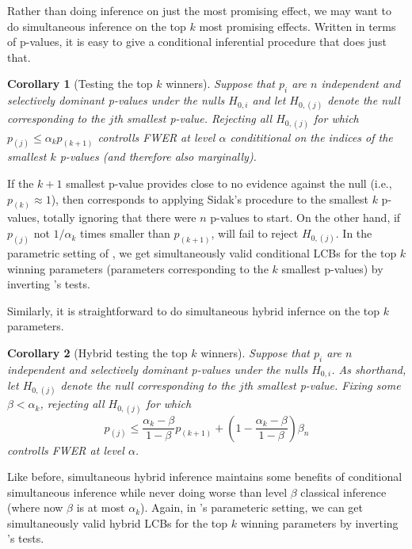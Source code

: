 \documentclass{article}
\newtheorem{corollary}{Corollary}
\begin{document}
Rather than doing inference on just the most promising effect, we may want to do simultaneous inference on the top $k$ most promising effects. Written in terms of p-values, it is easy to give a conditional inferential procedure that does just that. 
\begin{corollary}[Testing the top $k$ winners]
    \label{cor:cond_top_k}
    Suppose that $p_i$ are $n$ independent and selectively dominant p-values under the nulls $H_{0, i}$ and let $H_{0, (j)}$ denote the null corresponding to the $j$th smallest p-value. Rejecting all $H_{0, (j)}$ for which $p_{(j)} \leq \alpha_k p_{(k+1)}$ controlls FWER at level $\alpha$ condititional on the indices of the smallest $k$ p-values (and therefore also marginally). 
\end{corollary}
If the $k+1$ smallest p-value provides close to no evidence against the null (i.e., $p_{(k)} \approx 1$), then  corresponds to applying Sidak's procedure to the smallest $k$ p-values, totally ignoring that there were $n$ p-values to start. On the other hand, if $p_{(j)}$ not $1/\alpha_k$ times smaller than $p_{(k+ 1)}$,  will fail to reject $H_{0, (j)}$. In the parametric setting of , we get simultaneously valid conditional LCBs for the top $k$ winning parameters (parameters corresponding to the $k$ smallest p-values) by inverting 's tests. 


Similarly, it is straightforward to do simultaneous hybrid infernce on the top $k$ parameters. 
\begin{corollary}[Hybrid testing the top $k$ winners]
    \label{cor:hyb_top_k}
    Suppose that $p_i$ are $n$ independent and selectively dominant p-values under the nulls $H_{0, i}$. As shorthand, let $H_{0, (j)}$ denote the null corresponding to the $j$th smallest p-value. Fixing some $\beta < \alpha_k$, rejecting all $H_{0, (j)}$ for which 
    \begin{equation}
        p_{(j)} \leq  \frac{\alpha_k - \beta}{1-\beta}p_{(k + 1)} + \left( 1 - \frac{\alpha_k - \beta}{1-\beta} \right) \beta_n
    \end{equation}
    controlls FWER at level $\alpha$.
\end{corollary}

Like before, simultaneous hybrid inference maintains some benefits of conditional simultaneous inference while never doing worse than level $\beta$ classical inference (where now $\beta$ is at most $\alpha_k$). Again, in 's parameteric setting, we can get simultaneously valid hybrid LCBs for the top $k$ winning parameters by inverting 's tests. 
\end{document}
